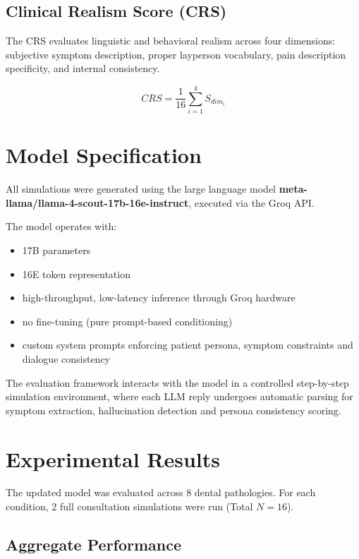 \documentclass{article}
\begin{document}
\subsection{Clinical Realism Score (CRS)}
The CRS evaluates linguistic and behavioral realism across four dimensions: subjective symptom description, proper layperson vocabulary, pain description specificity, and internal consistency.

\begin{equation}
    CRS = \frac{1}{16} \sum_{i=1}^{4} S_{dim_i}
\end{equation}

\section{Model Specification}

All simulations were generated using the large language model 
\textbf{meta-llama/llama-4-scout-17b-16e-instruct}, executed via the Groq API.

The model operates with:
\begin{itemize}
    \item 17B parameters
    \item 16E token representation
    \item high-throughput, low-latency inference through Groq hardware
    \item no fine-tuning (pure prompt-based conditioning)
    \item custom system prompts enforcing patient persona, symptom constraints
          and dialogue consistency
\end{itemize}

The evaluation framework interacts with the model in a controlled step-by-step
simulation environment, where each LLM reply undergoes automatic parsing for
symptom extraction, hallucination detection and persona consistency scoring.

\section{Experimental Results}

The updated model was evaluated across 8 dental pathologies. For each condition, 2 full consultation simulations were run (Total $N = 16$).

\subsection{Aggregate Performance}
\end{document}
